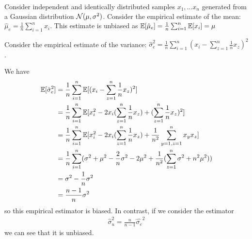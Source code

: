 \begin{example}
  \label{ex:biased:var}
  Consider independent and identically distributed samples $x_1, \dots x_n$ generated from a Gaussian distribution
  $\mathcal{N}(\mu, \sigma^2)$.
  Consider the empirical estimate of the mean: $\hat{\mu}_e = \frac1{n}
  \sum_{i=1}^n x_i$. This estimate is unbiased as $\mathbb{E}[\hat{\mu}_e] = \frac1{n}
  \sum_{i=1}^n \mathbb{E}[x_i] = \mu$
  

  Consider the empirical estimate of the variance:
  $\hat{\sigma}_e^2 = \frac1{n} \sum_{i=1}^n (x_i - \sum_{z=1}^n \frac1{n} x_z)^2$. 

  We have
  \begin{align}
    \mathbb{E}[\hat{\sigma}_e^2] &= \frac1{n} \sum_{i=1}^n \mathbb{E}[ (x_i - \sum_{z=1}^n \frac1{n} x_z)^2] \\
                        &= \frac1{n} \sum_{i=1}^n \mathbb{E} [x_i^2 - 2 x_i (\sum_{z=1}^n \frac1{n} x_z ) +(\sum_{z=1}^n \frac1{n} x_z )^2] \\
                        &= \frac1{n} \sum_{i=1}^n \mathbb{E} [x_i^2 - 2 x_i (\sum_{z=1}^n \frac1{n} x_z ) + \frac1{n^2}\sum_{y=1, z=1}^n  x_y x_z ] \\
                        &= \frac1{n} \sum_{i=1}^n (\sigma^2 + \mu^2 - \frac{2}{n}\sigma^2 -2\mu^2 +  \frac1{n^2} (\sum_{z=1}^n \sigma^2 + n^2 \mu^2)) \\
                        &= \sigma^2 - \frac1{n} \sigma^2 \\
                        &= \frac{n-1}{n}\sigma^2
  \end{align}
  so this empirical estimator is biased.
  In contrast, if we consider the estimator
  \begin{align}
    \hat{\sigma}_u^2 = \frac{n}{n-1}\hat{\sigma_e}^2
  \end{align}
  we can see that it is unbiased.
\end{example}

